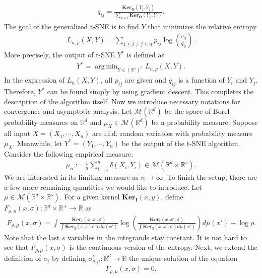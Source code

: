 \documentclass[10pt]{article}
\DeclareMathOperator*{\argmin}{arg\,min}
\newenvironment{Proof of lemma}{\noindent{\bf Proof of Lemma}}{\hfill$\Box$\newline}
\newenvironment{Proof of claim}{\noindent{\bf Proof of claim}}{\hfill$\Box$\newline}
\newenvironment{Proof of theorem}{\noindent{\bf Proof of Theorem}}{\hfill\scriptsize{$\Box$}\newline}
\newenvironment{Proof of theorems}{\noindent{\bf Proof of Theorems}}{\hfill$\Box$\newline}
\newenvironment{Proof of proposition}{\noindent{\bf Proof of Proposition}}{\hfill$\Box$\newline}
\newenvironment{Proof of propositions}{\noindent{\bf Proof of Propositions}}{\hfill$\Box$\newline}
\newenvironment{Proof of exercise}{\noindent{\it Proof of Exercise:}}{\hfill$\Box$}
\numberwithin{equation}{section}
\newcommand{\ki}{\mathbf{Ker}_{\mathbf{I}}}
\newcommand{\ko}{\mathbf{Ker}_{\mathbf{O}}}
\begin{document}
\begin{align}
    q_{ij} = \frac{\ko(Y_i,Y_j)}{\sum_{k \neq l}\ko(Y_k,Y_l)}.
\end{align}
The goal of the generalized t-SNE is to find $Y$ that minimizes the relative entropy
\begin{align}
    L_{n,\rho}(X,Y) = \sum_{1 \leq i \neq j \leq n} p_{ij} \log \left(\frac{p_{ij}}{q_{ij}}\right).
\end{align}
More precisely, the output of t-SNE $Y^*$ is defined as
\begin{align}
    Y^* = \argmin_{Y \in (\mathbb{R}^s)^n}L_{n,\rho}(X,Y).
\end{align}
In the expression of $L_n(X,Y)$, all $p_{ij}$ are given and $q_{ij}$ is a function of $Y_i$ and $Y_j$. Therefore, $Y^*$ can be found simply by using gradient descent. This completes the description of the algorithm itself. Now we introduce necessary notations for convergence and asymptotic analysis. Let $\mathcal{M}(\mathbb{R}^d)$ be the space of Borel probability measures on $\mathbb{R}^d$ and $\mu_X \in \mathcal{M}(\mathbb{R}^d)$ be a probability measure. Suppose all input $X = (X_1,\cdots,X_n)$ are i.i.d. random variables with probability measure $\mu_X$. Meanwhile, let $Y^* = (Y_1,\cdots,Y_n)$ be the output of the t-SNE algorithm. Consider the following empirical measure:
\begin{align}
    \mu_n := \frac{1}{n} \sum_{i=1}^n \delta(X_i,Y_i) \in \mathcal{M}(\mathbb{R}^d \times \mathbb{R}^s).
\end{align}
We are interested in its limiting measure as $n \to \infty$. To finish the setup, there are a few more remaining quantities we would like to introduce. Let $\mu \in \mathcal{M}(\mathbb{R}^d \times \mathbb{R}^s)$. For a given kernel $\ki(x,y)$, define $F_{\rho,\mu}(x,\sigma) : \mathbb{R}^d \times \mathbb{R}^+ \to \mathbb{R}$ as
\begin{align}
    F_{\rho,\mu}(x,\sigma) = \int \frac{\ki(x,x',\sigma)}{\int \ki(x,x',\sigma)d\mu(x')} \log \left(\frac{\ki(x,x',\sigma)}{\int \ki(x,x',\sigma)d\mu(x')}\right) d\mu(x') + \log \rho.
\end{align}
Note that the last $s$ variables in the integrands stay constant. It is not hard to see that $F_{\rho,\mu}(x,\sigma)$ is the continuous version of the entropy. Next, we extend the definition of $\sigma_i$ by defining $\sigma^*_{\rho,\mu} : \mathbb{R}^d \to \mathbb{R}$ the unique solution of the equation
\begin{align}
    F_{\rho,\mu}(x,\sigma) = 0.
\end{align}
\end{document}
